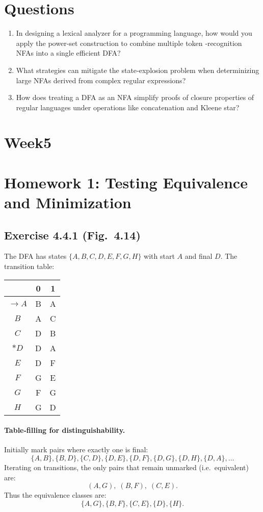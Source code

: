 \documentclass{article}
\begin{document}
\section*{Questions}
\begin{enumerate}
  \item In designing a lexical analyzer for a programming language, how
        would you apply the power‐set construction to combine multiple token
       ‐recognition NFAs into a single efficient DFA?  
  \item What strategies can mitigate the state‐explosion problem when
        determinizing large NFAs derived from complex regular expressions?  
  \item How does treating a DFA as an NFA simplify proofs of closure properties
        of regular languages under operations like concatenation and Kleene star?  
\end{enumerate}
\section{Week5}
\section*{Homework 1: Testing Equivalence and Minimization}
\subsection*{Exercise 4.4.1 (Fig.~4.14)}
The DFA has states $\{A,B,C,D,E,F,G,H\}$ with start $A$ and final $D$.  The transition table:
\begin{center}\begin{tabular}{c|cc}
       & 0 & 1 \\
\hline
$\to A$ & B & A \\
$B$     & A & C \\
$C$     & D & B \\
$\ast D$& D & A \\
$E$     & D & F \\
$F$     & G & E \\
$G$     & F & G \\
$H$     & G & D \\
\end{tabular}\end{center}

\paragraph{Table‑filling for distinguishability.}
Initially mark pairs where exactly one is final:
$$\{A,B\},\{B,D\},\{C,D\},\{D,E\},\{D,F\},\{D,G\},\{D,H\},\{D,A\},\dots$$
Iterating on transitions, the only pairs that remain unmarked (i.e.\ equivalent) are:
$$ (A,G),\;(B,F),\;(C,E).$$
Thus the equivalence classes are:
$$\{A,G\},\{B,F\},\{C,E\},\{D\},\{H\}.$$ 
\end{document}

